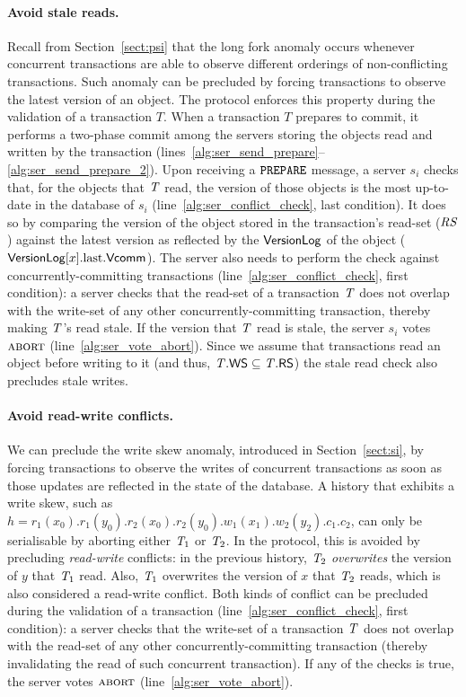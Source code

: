 \paragraph{Avoid stale reads.} Recall from Section~\ref{sect:psi} that the long fork anomaly occurs whenever concurrent transactions are able to observe different orderings of non-conflicting transactions. Such anomaly can be precluded by forcing transactions to observe the latest version of an object. The protocol enforces this property during the validation of a transaction $T$. When a transaction $T$ prepares to commit, it performs a two-phase commit among the servers storing the objects read and written by the transaction (lines~\ref{alg:ser_send_prepare}--\ref{alg:ser_send_prepare_2}). Upon receiving a ${\tt PREPARE}$ message, a server $s_i$ checks that, for the objects that $\mathit{T}$ read, the version of those objects is the most up-to-date in the database of $s_i$ (line~\ref{alg:ser_conflict_check}, last condition). It does so by comparing the version of the object stored in the transaction's read-set ($\mathit{RS}$) against the latest version as reflected by the $\mathsf{VersionLog}$ of the object ($\mathsf{VersionLog}[x].{\rm last}.\mathsf{Vcomm}$). The server also needs to perform the check against concurrently-committing transactions (line~\ref{alg:ser_conflict_check}, first condition): a server checks that the read-set of a transaction $\mathit{T}$ does not overlap with the write-set of any other concurrently-committing transaction, thereby making $\mathit{T}$'s read stale. If the version that $\mathit{T}$ read is stale, the server $s_i$ votes $\text{\sc abort}$ (line~\ref{alg:ser_vote_abort}). Since we assume that transactions read an object before writing to it (and thus, $\mathit{T}.\mathsf{WS} \subseteq \mathit{T}.\mathsf{RS}$) the stale read check also precludes stale writes.

\paragraph{Avoid read-write conflicts.} We can preclude the write skew anomaly, introduced in Section~\ref{sect:si}, by forcing transactions to observe the writes of concurrent transactions as soon as those updates are reflected in the state of the database. A history that exhibits a write skew, such as $h = r_1(x_0).r_1(y_0).r_2(x_0).r_2(y_0).w_1(x_1).w_2(y_2).c_1.c_2$, can only be serialisable by aborting either $\mathit{T}_1$ or $\mathit{T}_2$. In the protocol, this is avoided by precluding \emph{read-write} conflicts: in the previous history, $\mathit{T}_2$ \emph{overwrites} the version of $y$ that $\mathit{T}_1$ read. Also, $\mathit{T}_1$ overwrites the version of $x$ that $\mathit{T}_2$ reads, which is also considered a read-write conflict. Both kinds of conflict can be precluded during the validation of a transaction (line~\ref{alg:ser_conflict_check}, first condition): a server checks that the write-set of a transaction $\mathit{T}$ does not overlap with the read-set of any other concurrently-committing transaction (thereby invalidating the read of such concurrent transaction). If any of the checks is true, the server votes $\text{\sc abort}$ (line~\ref{alg:ser_vote_abort}).

